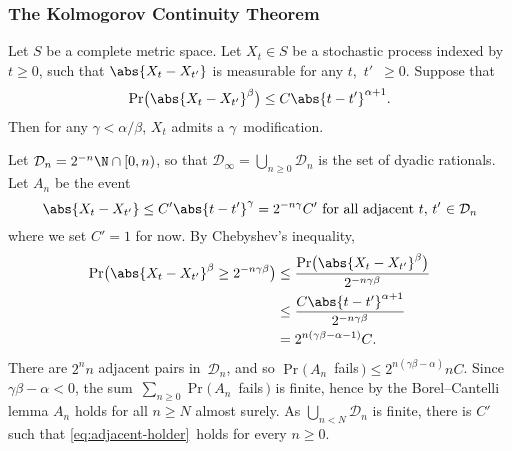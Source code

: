 \subsubsection	{The Kolmogorov Continuity Theorem}

\begin	{theorem}
Let $S$ be a complete metric space.
Let \( X_t \in S \) be a stochastic process indexed by \( t \ge 0 \),
such that $\abs{X_t-X_{t'}}$ is measurable for any $t$,~$t'$~$\ge 0$.
Suppose that
\begin	{equation}
\label	{eq:kolmogorov-continuity}
	\Pr\bigl(\abs{X_t-X_{t'}}^\beta\bigr) \le C\abs{t-t'}^{\alpha+1} \text.
\end	{equation}
Then for any \( \gamma < \alpha/\beta \),
$X_t$ admits a $\gamma$\dashHolder\ modification.
\end	{theorem}

Let \( \mathcal D_n = 2^{-n}\N \cap [0,n) \),
so that \( \mathcal D_\infty = \bigcup_{n \ge 0} \mathcal D_n \)
is the set of dyadic rationals.
Let $A_n$ be the event
\begin	{equation}
\label	{eq:adjacent-holder}
	\text{\( \abs{X_t-X_{t'}} \le C'\abs{t-t'}^\gamma = 2^{-n\gamma}C' \)
	for all adjacent $t$,~$t'$~$\in\mathcal D_n$}
\end	{equation}
where we set \( C' = 1 \) for now.
By Chebyshev's inequality,
\begin	{align*}
	\Pr\bigl( \abs{X_t-X_{t'}}^\beta \ge 2^{-n\gamma\beta} \bigr)
	&\le	\frac {\Pr\bigl( \abs{X_t-X_{t'}}^\beta \bigr)}
		              {2^{-n\gamma\beta}}                     \\
	&\le	\frac {C\abs{t-t'}^{\alpha+1}}
		        {2^{-n\gamma\beta}}                           \\
	&=	2^{n(\gamma\beta - \alpha - 1)} C                     \text.
\end	{align*}
There are $2^n n$ adjacent pairs in~$\mathcal D_n$,
and so \( \Pr(\, A_n \)~fails\( \,) \le 2^{n(\gamma\beta-\alpha)} nC \).
Since \( \gamma\beta - \alpha < 0 \),
the sum~\( \sum_{n \ge 0} \Pr(\, A_n \)~fails$\,)$ is finite,
hence by the Borel--Cantelli lemma
$A_n$ holds for all \( n \ge N \) almost surely.
As \( \bigcup_{n<N} \mathcal D_n \) is finite,
there is $C'$ such that \eqref{eq:adjacent-holder}~holds
for every \( n \ge 0 \).

